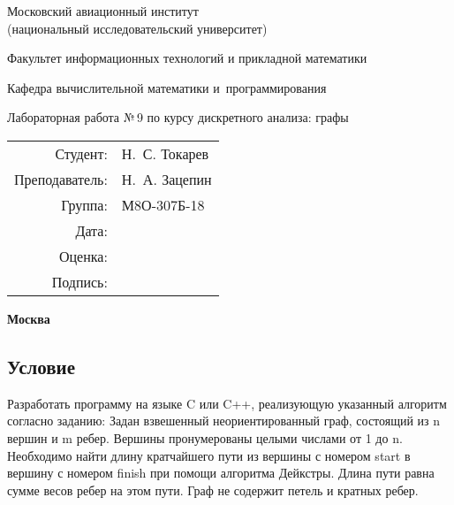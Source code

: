 \documentclass[12pt]{article}
\begin{document}
\thispagestyle{empty}
\begin{center}
	\bfseries

	{\Large Московский авиационный институт\\ (национальный исследовательский университет)

	}

	\vspace{48pt}

	{\large Факультет информационных технологий и прикладной математики
	}

	\vspace{36pt}


	{\large Кафедра вычислительной математики и~программирования

	}


	\vspace{48pt}

	{Лабораторная работа №\,9 по курсу дискретного анализа: графы}

\end{center}

\vspace{72pt}

\begin{flushright}
	\begin{tabular}{rl}
		Студент:       & Н.\, С. Токарев   \\
		Преподаватель: & Н.\, А. Зацепин \\
		Группа:        & М8О-307Б-18      \\
		Дата:          &                 \\
		Оценка:        &                  \\
		Подпись:       &                  \\
	\end{tabular}
\end{flushright}

\vfill

\begin{center}
	\bfseries
	Москва\\
	\the\year
\end{center}

\newpage

\subsection*{Условие}
Разработать программу на языке C или C++, реализующую указанный алгоритм согласно заданию:
Задан взвешенный неориентированный граф, состоящий из n вершин и m ребер. Вершины пронумерованы целыми числами от 1 до n. Необходимо найти длину кратчайшего пути из вершины с номером start в вершину с номером finish при помощи алгоритма Дейкстры. Длина пути равна сумме весов ребер на этом пути. Граф не содержит петель и кратных ребер.
\end{document}
